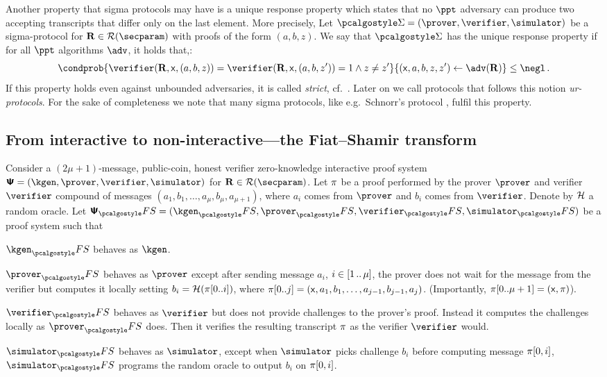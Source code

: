 Another property that sigma protocols may have is a unique response
property \cite{C:Fischlin05} which states that no $\ppt$ adversary can
produce two accepting transcripts that differ only on the last
element. More precisely, 
 Let
$\sigmaprot = (\prover, \verifier, \simulator)$ be a sigma-protocol for
$\REL \in \RELGEN(\secparam)$ with proofs of the form
$(a, b, z)$. We say that $\sigmaprot$ has the unique response property if for
all $\ppt$ algorithms $\adv$, it holds that,:
\[ \condprob{\verifier (\REL, \inp, (a, b, z)) = \verifier (\REL, \inp, (a, b,
	z')) = 1 \land z \neq z'}{(\inp, a, b, z, z') \gets \adv(\REL)} \leq \negl\,.  \]
If this property holds even against unbounded adversaries, it is called
\emph{strict}, cf.~\cite{INDOCRYPT:FKMV12}. Later on we call protocols that
follows this notion \emph{ur-protocols}. For the sake of completeness we note
that many sigma protocols, like e.g.~Schnorr's protocol \cite{C:Schnorr89},
fulfil this property.

\subsection{From interactive to non-interactive---the Fiat--Shamir transform}
Consider a $(2\mu + 1)$-message, public-coin, honest verifier zero-knowledge
interactive proof system
$\proofsystem = (\kgen, \prover, \verifier, \simulator)$ for
$\REL \in \RELGEN(\secparam)$.  Let $\pi$ be a proof performed by the
prover $\prover$ and verifier $\verifier$ compound of messages
$(a_1, b_1, \ldots, a_{\mu}, b_{\mu}, a_{\mu + 1})$, where $a_i$ comes from
$\prover$ and $b_i$ comes from $\verifier$.  Denote by $\mathcal{H}$ a random oracle.
Let $\proofsystem_\fs = (\kgen_\fs, \prover_\fs, \verifier_\fs, \simulator_\fs)$
be a proof system such that
\begin{compactitem}
  \item $\kgen_\fs$ behaves as $\kgen$.
  \item $\prover_\fs$ behaves as $\prover$ except after sending message
    $a_i$, $i \in [1 \, .. \, \mu]$, the prover does not wait for
    the message from the verifier but computes it locally setting $b_i
    = \mathcal{H}(\pi[0..i])$, where $\pi[0..j] = (\mathsf{x}, a_1, b_1, \ldots,
    a_{j - 1}, b_{j - 1}, a_j)$. (Importantly, $\pi[0..\mu + 1] =
    (\mathsf{x}, \pi)$).
  \item $\verifier_\fs$ behaves as $\verifier$ but does not provide
    challenges to the prover's proof. Instead it computes the
    challenges locally as $\prover_\fs$ does. Then it verifies the
    resulting transcript $\pi$ as the verifier $\verifier$ would. 
  \item $\simulator_\fs$ behaves as $\simulator$, except when
    $\simulator$ picks challenge $b_i$ before computing message $\pi[0, i]$, $\simulator_\fs$ programs the
    random oracle to output $b_i$ on $\pi[0, i]$.
  \end{compactitem}

